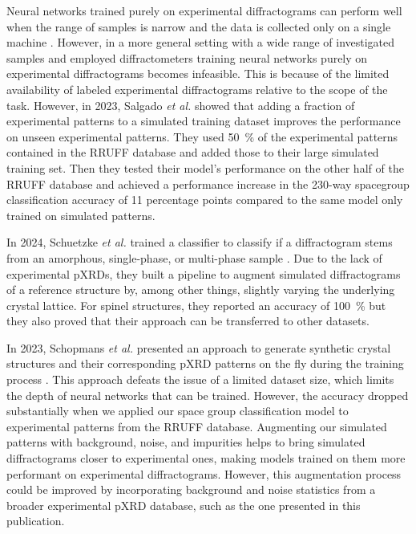 Neural networks trained purely on experimental diffractograms can perform well when the range of samples is narrow and the data is collected only on a single machine \cite{Lee2023, hattrick-simpers2021}. However, in a more general setting with a wide range of investigated samples and employed diffractometers training neural networks purely on experimental diffractograms becomes infeasible. This is because of the limited availability of labeled experimental diffractograms relative to the scope of the task. However, in 2023, Salgado {\it et al.} \cite{Salgado2023} showed that adding a fraction of experimental patterns to a simulated training dataset improves the performance on unseen experimental patterns. They used \SI{50}{\percent} of the experimental patterns contained in the RRUFF database and added those to their large simulated training set. Then they tested their model's performance on the other half of the RRUFF database and achieved a performance increase in the 230-way spacegroup classification accuracy of \num{11} percentage points compared to the same model only trained on simulated patterns.

In 2024, Schuetzke {\it et al.} trained a classifier to classify if a diffractogram stems from an amorphous, single-phase, or multi-phase sample \cite{Schuetzke2024}. Due to the lack of experimental pXRDs, they built a pipeline to augment simulated diffractograms of a reference structure by, among other things, slightly varying the underlying crystal lattice. For spinel structures, they reported an accuracy of \SI{100}{\percent} but they also proved that their approach can be transferred to other datasets.

In 2023, Schopmans {\it et al.} presented an approach to generate synthetic crystal structures and their corresponding pXRD patterns on the fly during the training process \cite{Schopmans2023}. This approach defeats the issue of a limited dataset size, which limits the depth of neural networks that can be trained. However, the accuracy dropped substantially when we applied our space group classification model to experimental patterns from the RRUFF database. Augmenting our simulated patterns with background, noise, and impurities helps to bring simulated diffractograms closer to experimental ones, making models trained on them more performant on experimental diffractograms. However, this augmentation process could be improved by incorporating background and noise statistics from a broader experimental pXRD database, such as the one presented in this publication.


